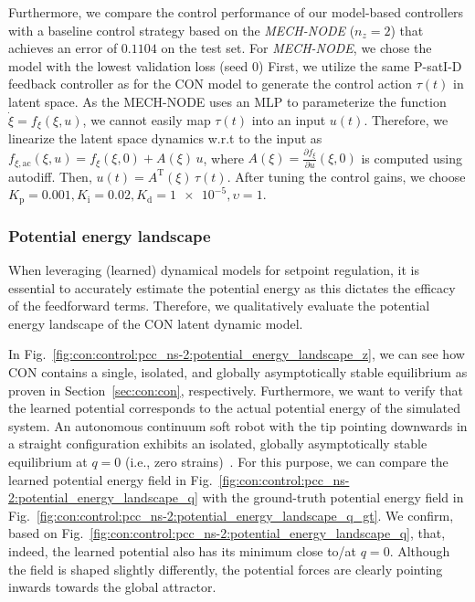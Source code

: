 Furthermore, we compare the control performance of our model-based controllers with a baseline control strategy based on the \emph{MECH-NODE} ($n_z = 2$) that achieves an error of $0.1104$ on the test set.
For \emph{MECH-NODE}, we chose the model with the lowest validation loss (seed $0$)
First, we utilize the same P-satI-D feedback controller as for the \gls{CON} model to generate the control action $\tau(t)$ in latent space. 
As the MECH-NODE uses an \gls{MLP} to parameterize the function $\dot{\xi} = f_\xi(\xi, u)$, we cannot easily map $\tau(t)$ into an input $u(t)$. 
Therefore, we linearize the latent space dynamics w.r.t to the input as $f_{\xi,\mathrm{ac}}(\xi, u) = f_\xi(\xi, 0) + A(\xi) \, u$, where $A(\xi) = \frac{\partial f_\xi}{\partial u}(\xi, 0)$ is computed using autodiff. Then, $u(t) = A^\mathrm{T}(\xi) \, \tau(t)$. After tuning the control gains, we choose  $K_\mathrm{p} = 0.001, K_\mathrm{i}=0.02, K_\mathrm{d} = \num{1e-5}, \upsilon = 1$.

\subsubsection{Potential energy landscape}
When leveraging (learned) dynamical models for setpoint regulation, it is essential to accurately estimate the potential energy as this dictates the efficacy of the feedforward terms. Therefore, we qualitatively evaluate the potential energy landscape of the \gls{CON} latent dynamic model.

In Fig.~\ref{fig:con:control:pcc_ns-2:potential_energy_landscape_z}, we can see how \gls{CON} contains a single, isolated, and globally asymptotically stable equilibrium as proven in Section~\ref{sec:con:con}, respectively. 
% 
Furthermore, we want to verify that the learned potential corresponds to the actual potential energy of the simulated system.
An autonomous continuum soft robot with the tip pointing downwards in a straight configuration exhibits an isolated, globally asymptotically stable equilibrium at $q = 0$ (i.e., zero strains)~\cite{stolzle2021piston}.
For this purpose, we can compare the learned potential energy field in Fig.~\ref{fig:con:control:pcc_ns-2:potential_energy_landscape_q} with the ground-truth potential energy field in Fig.~\ref{fig:con:control:pcc_ns-2:potential_energy_landscape_q_gt}.
We confirm, based on Fig.~\ref{fig:con:control:pcc_ns-2:potential_energy_landscape_q}, that, indeed, the learned potential also has its minimum close to/at $q=0$. Although the field is shaped slightly differently, the potential forces are clearly pointing inwards towards the global attractor.

